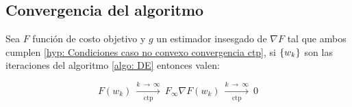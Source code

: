 \subsection{Convergencia del algoritmo}

\begin{theorem}
	Sea $F$ funci\'on de costo objetivo y $g$ un estimador insesgado de $\nabla F$ tal que ambos cumplen \ref{hyp: Condiciones caso no convexo convergencia ctp}, si $\left\lbrace w_k\right\rbrace$ son las iteraciones del algoritmo \ref{algo: DE} entonces valen:
	
		\begin{subequations}
		\begin{equation}
		F(w_k) \ \xrightarrow[\text{ctp}]{k \ \rightarrow \ \infty } \ F_{\infty}
		\end{equation}
		\begin{equation}
		\nabla F(w_k) \ \xrightarrow[\text{ctp}]{k \ \rightarrow \ \infty } \ 0
		\end{equation}
	\end{subequations}
	
\end{theorem}

